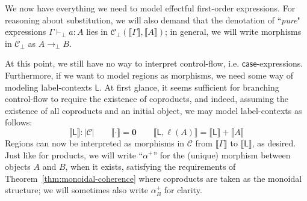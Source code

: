 \documentclass[acmsmall,screen,review]{acmart}
\newcommand{\mc}[1]{\ensuremath{\mathcal{#1}}}
\newcommand{\mb}[1]{\ensuremath{\mathbf{#1}}}
\newcommand{\ms}[1]{\ensuremath{\mathsf{#1}}}
\newcommand{\lhyp}[2]{#1(#2)}
\newcommand{\hasty}[4]{#1 \vdash_{#2} #3: {#4}}
\newcommand{\dnt}[1]{\llbracket{#1}\rrbracket}
\begin{document}
We now have everything we need to model effectful first-order expressions. For reasoning about
substitution, we will also demand that the denotation of ``\emph{pure}" expressions
$\hasty{\Gamma}{\bot}{a}{A}$ lies in $\mc{C}_\bot(\dnt{\Gamma}, \dnt{A})$; in general, we will write
morphisms in $\mc{C}_\bot$ as $A \to_\bot B$.

At this point, we still have no way to interpret control-flow, i.e. $\ms{case}$-expressions.
Furthermore, if we want to model regions as morphisms, we need some way of modeling label-contexts
$\ms{L}$. At first glance, it seems sufficient for branching control-flow to require the existence
of coproducts, and indeed, assuming the existence of all coproducts and an initial object, we may
model label-contexts as follows:
$$
\boxed{\dnt{\ms{L}} : |\mc{C}|} \qquad 
  \dnt{\cdot} = \mb{0} \qquad \dnt{\ms{L}, \lhyp{\ell}{A}} = \dnt{\ms{L}} + \dnt{A}
$$
Regions can now be interpreted as morphisms in $\mc{C}$ from $\dnt{\Gamma}$ to $\dnt{\ms{L}}$, as
desired. Just like for products, we will write ``$\alpha^+$'' for the (unique) morphism between
objects $A$ and $B$, when it exists, satisfying the requirements of
Theorem~\ref{thm:monoidal-coherence} where coproducts are taken as the monoidal structure; we will
sometimes also write $\alpha^+_B$ for clarity.
\end{document}
